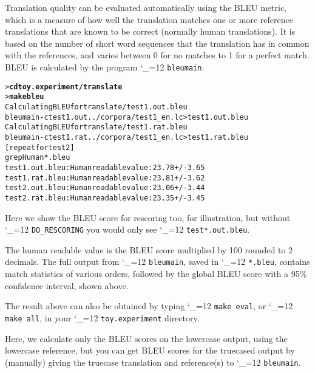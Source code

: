 \documentclass[11pt,letterpaper]{article}
\def\code{\begingroup\catcode`\_=12 \codex}
\newcommand{\codex}[1]{\texttt{#1}\endgroup}
\begin{document}
Translation quality can be evaluated automatically using the BLEU metric, which
is a measure of how well the translation matches one or more reference
translations that are known to be correct (normally human translations). It is
based on the number of short word sequences that the translation has in common
with the references, and varies between 0 for no matches to 1 for a perfect
match. BLEU is calculated by the program \code{bleumain}:
\begin{small}
\begin{alltt}
   > \textbf{cd toy.experiment/translate}
   > \textbf{make bleu}
   Calculating BLEU for translate/test1.out.bleu
   bleumain -c test1.out ../corpora/test1_en.lc > test1.out.bleu
   Calculating BLEU for translate/test1.rat.bleu
   bleumain -c test1.rat ../corpora/test1_en.lc > test1.rat.bleu
   [repeat for test2]
   grep Human *.bleu
   test1.out.bleu:Human readable value: 23.78 +/- 3.65
   test1.rat.bleu:Human readable value: 23.81 +/- 3.62
   test2.out.bleu:Human readable value: 23.06 +/- 3.44
   test2.rat.bleu:Human readable value: 23.35 +/- 3.45
\end{alltt}
\end{small}
Here we show the BLEU score for rescoring too, for illustration, but without
\code{DO_RESCORING} you would only see \code{test*.out.bleu}.

The human readable value is the BLEU score multiplied by 100 rounded to 2
decimals. The full output from \code{bleumain}, saved in \code{*.bleu},
contains match statistics of various orders, followed by the global BLEU score
with a 95\% confidence interval, shown above.

The result above can also be obtained by typing \code{make eval}, or
\code{make all}, in your \code{toy.experiment} directory.

Here, we calculate only the BLEU scores on the lowercase output, using the
lowercase reference, but you can get BLEU scores for the truecased output by
(manually) giving the truecase translation and reference(s) to \code{bleumain}.
\end{document}

